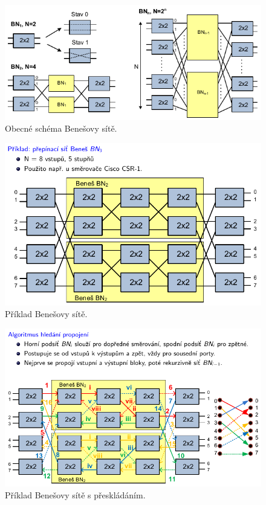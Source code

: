 \begin{figure}[H]
    \centering
    \includegraphics[width=0.9\linewidth]{benes.pdf}
    \caption{Obecné schéma Benešovy sítě.}
\end{figure}

\begin{figure}[H]
    \centering
    \includegraphics[width=0.9\linewidth]{benes_priklad_1.pdf}
    \caption{Příklad Benešovy sítě.}
\end{figure}

\begin{figure}[H]
    \centering
    \includegraphics[width=1\linewidth]{benes_priklad_2.pdf}
    \caption{Příklad Benešovy sítě s přeskládáním.}
\end{figure}
